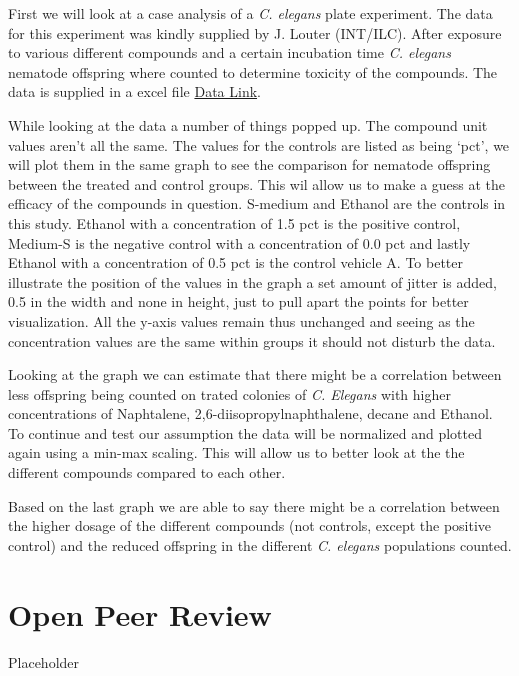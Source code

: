 \documentclass[11pt,a4paper,]{awesome-cv}
\begin{document}
First we will look at a case analysis of a \emph{C. elegans} plate
experiment. The data for this experiment was kindly supplied by J.
Louter (INT/ILC). After exposure to various different compounds and a
certain incubation time \emph{C. elegans} nematode offspring where
counted to determine toxicity of the compounds. The data is supplied in
a excel file
\href{https://github.com/DataScienceILC/tlsc-dsfb26v-20_workflows/raw/main/data/CE.LIQ.FLOW.062_Tidydata.xlsx}{Data
Link}.

While looking at the data a number of things popped up. The compound
unit values aren't all the same. The values for the controls are listed
as being `pct', we will plot them in the same graph to see the
comparison for nematode offspring between the treated and control
groups. This wil allow us to make a guess at the efficacy of the
compounds in question. S-medium and Ethanol are the controls in this
study. Ethanol with a concentration of 1.5 pct is the positive control,
Medium-S is the negative control with a concentration of 0.0 pct and
lastly Ethanol with a concentration of 0.5 pct is the control vehicle A.
To better illustrate the position of the values in the graph a set
amount of jitter is added, 0.5 in the width and none in height, just to
pull apart the points for better visualization. All the y-axis values
remain thus unchanged and seeing as the concentration values are the
same within groups it should not disturb the data.

Looking at the graph we can estimate that there might be a correlation
between less offspring being counted on trated colonies of \emph{C.
Elegans} with higher concentrations of Naphtalene,
2,6-diisopropylnaphthalene, decane and Ethanol. To continue and test our
assumption the data will be normalized and plotted again using a min-max
scaling. This will allow us to better look at the the different
compounds compared to each other.

Based on the last graph we are able to say there might be a correlation
between the higher dosage of the different compounds (not controls,
except the positive control) and the reduced offspring in the different
\emph{C. elegans} populations counted.

\hypertarget{open-peer-review}{%
\chapter{Open Peer Review}\label{open-peer-review}}

Placeholder
\end{document}
